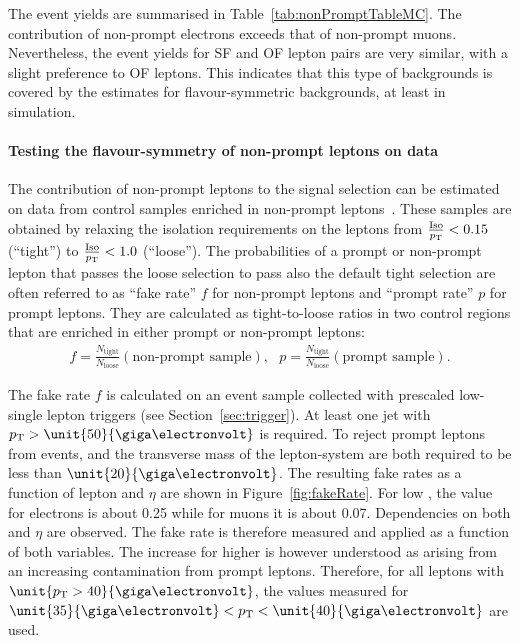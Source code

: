 The event yields are summarised in Table~\ref{tab:nonPromptTableMC}. The contribution of non-prompt electrons exceeds that of non-prompt muons. Nevertheless, the event yields for SF and OF lepton pairs are very similar, with a slight preference to OF leptons. This indicates that this type of backgrounds is covered by the estimates for flavour-symmetric backgrounds, at least in simulation.


\paragraph*{Testing the flavour-symmetry of non-prompt leptons on data}
The contribution of non-prompt leptons to the signal selection can be estimated on data from control samples enriched in non-prompt leptons~\cite{fakesnote1,fakesnote2}. These samples are obtained by relaxing the isolation requirements on the leptons from $\frac{\text{Iso}}{p_{\mathrm{T}}} < 0.15$ (``tight'') to $\frac{\text{Iso}}{p_{\mathrm{T}}}<1.0$ (``loose''). The probabilities of a prompt or non-prompt lepton that passes the loose selection to pass also the default tight selection are often referred to as ``fake rate'' $f$ for non-prompt leptons and ``prompt rate'' $p$ for prompt leptons. They are calculated as tight-to-loose ratios in two control regions that are enriched in either prompt or non-prompt leptons:
\begin{eqnarray}
f = \frac{N_{\text{tight}}}{N_{\text{loose}}} (\text{non-prompt sample}),\text{                }  p = \frac{N_{\text{tight}}}{N_{\text{loose}}} (\text{prompt sample}).
\end{eqnarray} 

The fake rate $f$ is calculated on an event sample collected with prescaled low-\pt single lepton triggers (see Section~\ref{sec:trigger}). At least one jet with $\pt > \unit{50}{\giga\electronvolt}$ is required. To reject prompt leptons from \Wjets events, \MET and the transverse mass of the lepton-\MET system are both required to be less than $\unit{20}{\giga\electronvolt}$. The resulting fake rates as a function of lepton \pt and $\eta$ are shown in Figure~\ref{fig:fakeRate}. For low \pt, the value for electrons is about 0.25 while for muons it is about 0.07. Dependencies on both \pt and $\eta$ are observed. The fake rate is therefore measured and applied as a function of both variables. The increase for higher \pt is however understood as arising from an increasing contamination from prompt leptons. Therefore, for all leptons with $\unit{\pt > 40}{\giga\electronvolt}$, the values measured for $\unit{35}{\giga\electronvolt} < \pt < \unit{40}{\giga\electronvolt}$ are used.  

